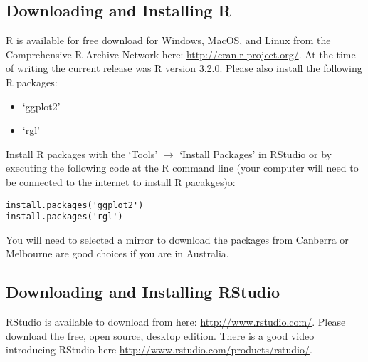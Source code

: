 \documentclass{article}[12pt]
\begin{document}
\subsection*{Downloading and Installing R}
R is available for free download for Windows, MacOS, and Linux from the Comprehensive R Archive Network here: \url{http://cran.r-project.org/}.  At the time of writing the current release was R version 3.2.0.
\newline
\newline
Please also install the following R packages:  \begin{itemize}
 \item `ggplot2'
 \item `rgl' \end{itemize}
Install R packages with the `Tools' $\rightarrow$ `Install Packages' in RStudio or by executing the following code at the R command line (your computer will need to be connected to the internet to install R pacakges)o:
\begin{verbatim}
install.packages('ggplot2')
install.packages('rgl')
\end{verbatim}
You will need to selected a mirror to download the packages from Canberra or Melbourne are good choices if you are in Australia.

\subsection*{Downloading and Installing RStudio}
RStudio is available to download from here: \url{http://www.rstudio.com/}.
Please download the free, open source, desktop edition.
There is a good video introducing RStudio here \url{http://www.rstudio.com/products/rstudio/}.
\end{document}
